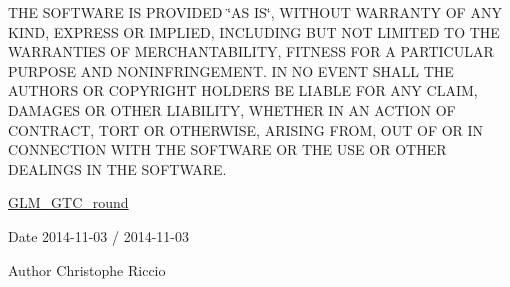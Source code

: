 T\+H\+E S\+O\+F\+T\+W\+A\+R\+E I\+S P\+R\+O\+V\+I\+D\+E\+D \char`\"{}\+A\+S I\+S\char`\"{}, W\+I\+T\+H\+O\+U\+T W\+A\+R\+R\+A\+N\+T\+Y O\+F A\+N\+Y K\+I\+N\+D, E\+X\+P\+R\+E\+S\+S O\+R I\+M\+P\+L\+I\+E\+D, I\+N\+C\+L\+U\+D\+I\+N\+G B\+U\+T N\+O\+T L\+I\+M\+I\+T\+E\+D T\+O T\+H\+E W\+A\+R\+R\+A\+N\+T\+I\+E\+S O\+F M\+E\+R\+C\+H\+A\+N\+T\+A\+B\+I\+L\+I\+T\+Y, F\+I\+T\+N\+E\+S\+S F\+O\+R A P\+A\+R\+T\+I\+C\+U\+L\+A\+R P\+U\+R\+P\+O\+S\+E A\+N\+D N\+O\+N\+I\+N\+F\+R\+I\+N\+G\+E\+M\+E\+N\+T. I\+N N\+O E\+V\+E\+N\+T S\+H\+A\+L\+L T\+H\+E A\+U\+T\+H\+O\+R\+S O\+R C\+O\+P\+Y\+R\+I\+G\+H\+T H\+O\+L\+D\+E\+R\+S B\+E L\+I\+A\+B\+L\+E F\+O\+R A\+N\+Y C\+L\+A\+I\+M, D\+A\+M\+A\+G\+E\+S O\+R O\+T\+H\+E\+R L\+I\+A\+B\+I\+L\+I\+T\+Y, W\+H\+E\+T\+H\+E\+R I\+N A\+N A\+C\+T\+I\+O\+N O\+F C\+O\+N\+T\+R\+A\+C\+T, T\+O\+R\+T O\+R O\+T\+H\+E\+R\+W\+I\+S\+E, A\+R\+I\+S\+I\+N\+G F\+R\+O\+M, O\+U\+T O\+F O\+R I\+N C\+O\+N\+N\+E\+C\+T\+I\+O\+N W\+I\+T\+H T\+H\+E S\+O\+F\+T\+W\+A\+R\+E O\+R T\+H\+E U\+S\+E O\+R O\+T\+H\+E\+R D\+E\+A\+L\+I\+N\+G\+S I\+N T\+H\+E S\+O\+F\+T\+W\+A\+R\+E.

\hyperlink{group__gtc__round}{G\+L\+M\+\_\+\+G\+T\+C\+\_\+round}

\begin{DoxyDate}{Date}
2014-\/11-\/03 / 2014-\/11-\/03 
\end{DoxyDate}
\begin{DoxyAuthor}{Author}
Christophe Riccio 
\end{DoxyAuthor}
